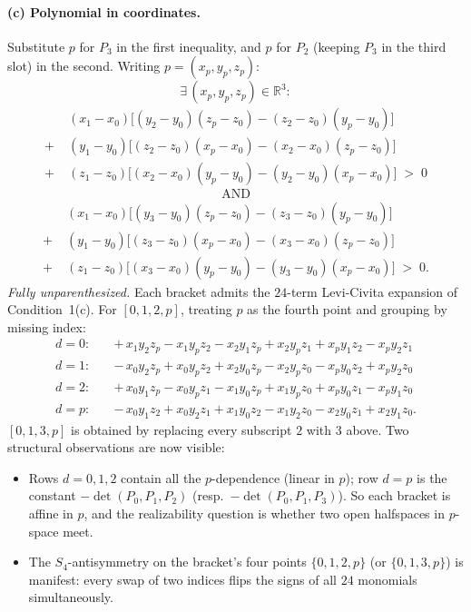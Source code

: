 \documentclass[11pt]{article}
\begin{document}
\paragraph{(c) Polynomial in coordinates.}
Substitute $p$ for $P_3$ in the first inequality, and $p$ for $P_2$ (keeping $P_3$
in the third slot) in the second. Writing $p=(x_p, y_p, z_p)$:
\[
\exists\,(x_p, y_p, z_p)\in\mathbb{R}^3:
\]
\[
\begin{aligned}
&(x_1{-}x_0)\bigl[(y_2{-}y_0)(z_p{-}z_0) - (z_2{-}z_0)(y_p{-}y_0)\bigr] \\
+\;&(y_1{-}y_0)\bigl[(z_2{-}z_0)(x_p{-}x_0) - (x_2{-}x_0)(z_p{-}z_0)\bigr] \\
+\;&(z_1{-}z_0)\bigl[(x_2{-}x_0)(y_p{-}y_0) - (y_2{-}y_0)(x_p{-}x_0)\bigr] \;>\; 0
\end{aligned}
\]
\[
\text{AND}
\]
\[
\begin{aligned}
&(x_1{-}x_0)\bigl[(y_3{-}y_0)(z_p{-}z_0) - (z_3{-}z_0)(y_p{-}y_0)\bigr] \\
+\;&(y_1{-}y_0)\bigl[(z_3{-}z_0)(x_p{-}x_0) - (x_3{-}x_0)(z_p{-}z_0)\bigr] \\
+\;&(z_1{-}z_0)\bigl[(x_3{-}x_0)(y_p{-}y_0) - (y_3{-}y_0)(x_p{-}x_0)\bigr] \;>\; 0.
\end{aligned}
\]
\emph{Fully unparenthesized.} Each bracket admits the $24$-term Levi-Civita
expansion of Condition~1(c). For $[0,1,2,p]$, treating $p$ as the fourth point
and grouping by missing index:
\[
\begin{aligned}
d{=}0:\quad &+\,x_1 y_2 z_p - x_1 y_p z_2 - x_2 y_1 z_p + x_2 y_p z_1 + x_p y_1 z_2 - x_p y_2 z_1 \\
d{=}1:\quad &-\,x_0 y_2 z_p + x_0 y_p z_2 + x_2 y_0 z_p - x_2 y_p z_0 - x_p y_0 z_2 + x_p y_2 z_0 \\
d{=}2:\quad &+\,x_0 y_1 z_p - x_0 y_p z_1 - x_1 y_0 z_p + x_1 y_p z_0 + x_p y_0 z_1 - x_p y_1 z_0 \\
d{=}p:\quad &-\,x_0 y_1 z_2 + x_0 y_2 z_1 + x_1 y_0 z_2 - x_1 y_2 z_0 - x_2 y_0 z_1 + x_2 y_1 z_0.
\end{aligned}
\]
$[0,1,3,p]$ is obtained by replacing every subscript $2$ with $3$ above. Two
structural observations are now visible:
\begin{itemize}
  \item Rows $d=0,1,2$ contain all the $p$-dependence (linear in $p$); row $d=p$
  is the constant $-\det(P_0,P_1,P_2)$ (resp.\ $-\det(P_0,P_1,P_3)$). So each
  bracket is affine in $p$, and the realizability question is whether two open
  halfspaces in $p$-space meet.
  \item The $S_4$-antisymmetry on the bracket's four points $\{0,1,2,p\}$ (or
  $\{0,1,3,p\}$) is manifest: every swap of two indices flips the signs of all
  $24$ monomials simultaneously.
\end{itemize}
\end{document}
